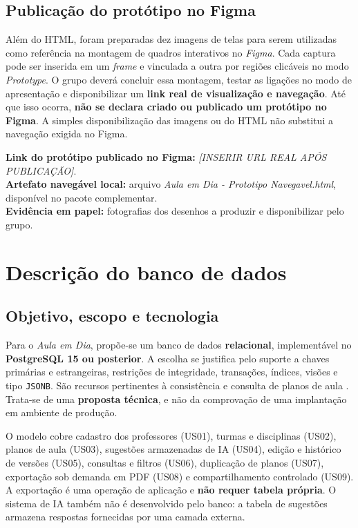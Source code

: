\documentclass[12pt,a4paper,oneside]{report}
\begin{document}
\subsection{Publicação do protótipo no Figma}
Além do HTML, foram preparadas dez imagens de telas para serem utilizadas como referência na montagem de quadros interativos no \textit{Figma}. Cada captura pode ser inserida em um \textit{frame} e vinculada a outra por regiões clicáveis no modo \textit{Prototype}. O grupo deverá concluir essa montagem, testar as ligações no modo de apresentação e disponibilizar um \textbf{link real de visualização e navegação}. Até que isso ocorra, \textbf{não se declara criado ou publicado um protótipo no Figma}. A simples disponibilização das imagens ou do HTML não substitui a navegação exigida no Figma.

\noindent\textbf{Link do protótipo publicado no Figma:} \emph{[INSERIR URL REAL APÓS PUBLICAÇÃO]}.\\
\textbf{Artefato navegável local:} arquivo \textit{Aula em Dia - Prototipo Navegavel.html}, disponível no pacote complementar.\\
\textbf{Evidência em papel:} fotografias dos desenhos a produzir e disponibilizar pelo grupo.

\section{Descrição do banco de dados}
\subsection{Objetivo, escopo e tecnologia}
Para o \textit{Aula em Dia}, propõe-se um banco de dados \textbf{relacional}, implementável no \textbf{PostgreSQL 15 ou posterior}. A escolha se justifica pelo suporte a chaves primárias e estrangeiras, restrições de integridade, transações, índices, visões e tipo \texttt{JSONB}. São recursos pertinentes à consistência e consulta de planos de aula \citep{postgres_constraints,postgres_json}. Trata-se de uma \textbf{proposta técnica}, e não da comprovação de uma implantação em ambiente de produção.

O modelo cobre cadastro dos professores (US01), turmas e disciplinas (US02), planos de aula (US03), sugestões armazenadas de IA (US04), edição e histórico de versões (US05), consultas e filtros (US06), duplicação de planos (US07), exportação sob demanda em PDF (US08) e compartilhamento controlado (US09). A exportação é uma operação de aplicação e \textbf{não requer tabela própria}. O sistema de IA também não é desenvolvido pelo banco: a tabela de sugestões armazena respostas fornecidas por uma camada externa.
\end{document}
